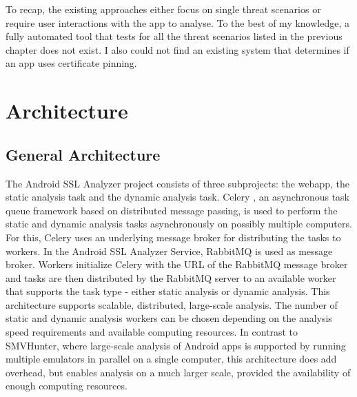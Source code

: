 \documentclass[draft,final]{vutinfth} %
\begin{document}
To recap, the existing approaches either focus on single threat scenarios or require user interactions with the app to analyse. To the best of my knowledge, a fully automated tool that tests for all the threat scenarios listed in the previous chapter does not exist. I also could not find an existing system that determines if an app uses certificate pinning.



\chapter{Architecture}

\section*{General Architecture}

The Android SSL Analyzer project consists of three subprojects: the webapp, the static analysis task and the dynamic analysis task. Celery \cite{Celery}, an asynchronous task queue framework based on distributed message passing, is used to perform the static and dynamic analysis tasks asynchronously on possibly multiple computers. For this, Celery uses an underlying message broker for distributing the tasks to workers. In the Android SSL Analyzer Service, RabbitMQ \cite{RabbitMQ} is used as message broker. Workers initialize Celery with the URL of the RabbitMQ message broker and tasks are then distributed by the RabbitMQ server to an available worker that supports the task type - either static analysis or dynamic analysis. This architecture supports scalable, distributed, large-scale analysis. The number of static and dynamic analysis workers can be chosen depending on the analysis speed requirements and available computing resources. In contrast to SMVHunter, where large-scale analysis of Android apps is supported by running multiple emulators in parallel on a single computer, this architecture does add overhead, but enables analysis on a much larger scale, provided the availability of enough computing resources.
\end{document}
